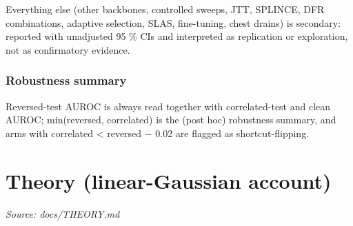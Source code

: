 {Everything else (other backbones, controlled sweeps, JTT, SPLINCE, DFR combinations, adaptive selection, SLAS,
fine-tuning, chest drains) is secondary: reported with unadjusted 95 \% CIs and interpreted as replication or
exploration, not as confirmatory evidence.

\subsubsection{Robustness summary}\label{robustness-summary}

Reversed-test AUROC is always read together with correlated-test and clean AUROC; min(reversed, correlated) is the
(post hoc) robustness summary, and arms with correlated \textless{} reversed − 0.02 are flagged as shortcut-flipping.

}

\section{Theory (linear-Gaussian account)}\label{doc:THEORY}
\noindent\textit{Source: docs/THEORY.md}

